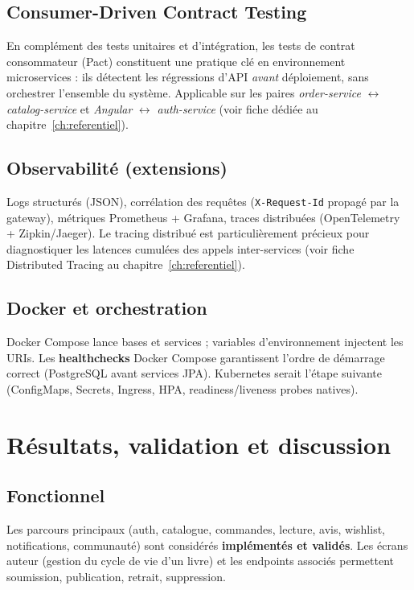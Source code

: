 \documentclass[12pt,a4paper]{report}
\begin{document}
\section{Consumer-Driven Contract Testing}
En complément des tests unitaires et d'intégration, les tests de contrat consommateur (Pact) constituent une pratique clé en environnement microservices : ils détectent les régressions d'API \textit{avant} déploiement, sans orchestrer l'ensemble du système. Applicable sur les paires \textit{order-service} $\leftrightarrow$ \textit{catalog-service} et \textit{Angular} $\leftrightarrow$ \textit{auth-service} (voir fiche dédiée au chapitre~\ref{ch:referentiel}).\par

\section{Observabilité (extensions)}
Logs structurés (JSON), corrélation des requêtes (\texttt{X-Request-Id} propagé par la gateway), métriques Prometheus + Grafana, traces distribuées (OpenTelemetry + Zipkin/Jaeger). Le tracing distribué est particulièrement précieux pour diagnostiquer les latences cumulées des appels inter-services (voir fiche Distributed Tracing au chapitre~\ref{ch:referentiel}).\par

\section{Docker et orchestration}
Docker Compose lance bases et services ; variables d'environnement injectent les URIs. Les \textbf{healthchecks} Docker Compose garantissent l'ordre de démarrage correct (PostgreSQL avant services JPA). Kubernetes serait l'étape suivante (ConfigMaps, Secrets, Ingress, HPA, readiness/liveness probes natives).\par

\chapter{Résultats, validation et discussion}
\section{Fonctionnel}
Les parcours principaux (auth, catalogue, commandes, lecture, avis, wishlist, notifications, communauté) sont considérés \textbf{implémentés et validés}. Les écrans auteur (gestion du cycle de vie d'un livre) et les endpoints associés permettent soumission, publication, retrait, suppression.\par
\end{document}
